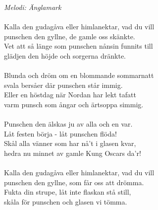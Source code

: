 {\footnotesize\textit{Melodi: Änglamark}}\\
\\
Kalla den gudagåva eller himlanektar, vad du vill\\
punschen den gyllne, de gamle oss skänkte.\\
Vet att så länge som punschen nånsin funnits till\\
glädjen den höjde och sorgerna dränkte.\\
\\
Blunda och dröm om en blommande sommarnatt\\
svala bersåer där punschen står immig.\\
Eller en höstdag när Nordan har lekt tafatt\\
varm punsch som ångar och ärtsoppa simmig.\\
\\
Punschen den älskas ju av alla och en var.\\
Låt festen börja - låt punschen flöda!\\
Skål alla vänner som har nå’t i glasen kvar,\\
hedra nu minnet av gamle Kung Oscars da'r!\\
\\
Kalla den gudagåva eller himlanektar, vad du vill\\
punschen den gyllne, som får oss att drömma.\\
Fukta din strupe, låt inte flaskan stå still,\\
skåla för punschen och glasen vi tömma.
